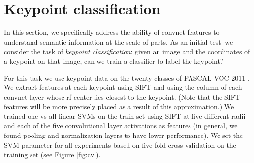 \documentclass{article} \usepackage{nips14submit_e,times}
\begin{document}
\begin{table}
\centering
\caption{
Keypoint transfer accuracy using convnet flow, SIFT flow, and simple copying
from nearest neighbors. Accuracy (PCK) is shown per category using  (see
text) and means are also shown for the stricter values  and
. On average, convnet flow performs as well as SIFT flow, and performs a
bit better for stricter tolerances.
}
\label{tab:align}
\end{table}




\section{Keypoint classification}

In this section, we specifically address the ability of convnet features to
understand semantic information at the scale of parts.
As an initial test, we consider the task of \emph{keypoint classification}:
given an image and the coordinates of a keypoint on that image, can we train a classifier to label
the keypoint?

For this task we use keypoint data \cite{BourdevMalikICCV09} on the twenty classes
of PASCAL VOC 2011 \cite{pascal}.
We extract features at each keypoint using SIFT \cite{SIFT} and using the column
of each convnet layer whose rf center lies closest to the keypoint. (Note that the
SIFT  features will be more precisely placed as a result of this approximation.)
We trained one-vs-all linear SVMs on the train set using SIFT at five different
radii and each of the five convolutional layer activations
as features (in general, we found pooling and normalization layers to have lower
performance).
We set the SVM parameter  for all experiments based on five-fold cross validation on
the training set (see Figure \ref{fig:cv}).
\end{document}
